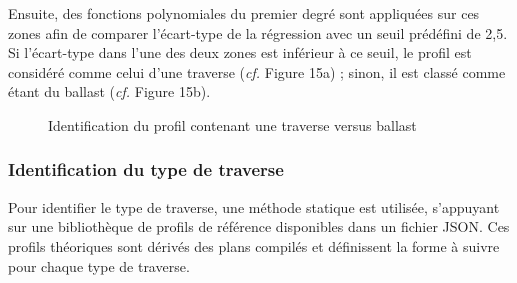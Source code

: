 \noindent Ensuite, des fonctions polynomiales du premier degré sont appliquées sur ces zones afin de comparer l'écart-type de la régression avec un seuil prédéfini de 2,5. Si l'écart-type dans l'une des deux zones est inférieur à ce seuil, le profil est considéré comme celui d'une traverse (\textit{cf.} Figure 15a) ; sinon, il est classé comme étant du ballast (\textit{cf.} Figure 15b).
 
 \begin{figure}[H]
      \centering
      \qquad %

      \caption{Identification du profil contenant une traverse versus ballast}

    \end{figure}
        

\subsubsection{Identification du type de traverse}
Pour identifier le type de traverse, une méthode statique est utilisée, s'appuyant sur une bibliothèque de profils de référence disponibles dans un fichier JSON. Ces profils théoriques sont dérivés des plans compilés et définissent la forme à suivre pour chaque type de traverse. \\


